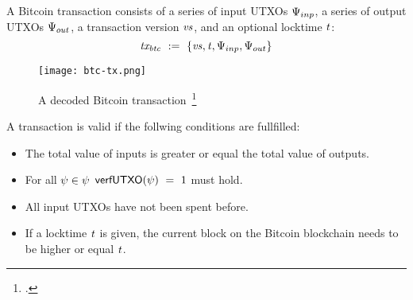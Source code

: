 \begin{definition}
    A Bitcoin transaction consists of a series of input UTXOs $\Psi_{inp}$, a series of output UTXOs $\Psi_{out}$, a
    transaction version $\mathit{vs}$, and an optional locktime $\mathit{t}$:
    \[ \mathit{tx_{btc}} ~:=~ \{ \mathit{vs}, \mathit{t}, \Psi_{inp}, \Psi_{out} \} \]
\end{definition}

\begin{figure}
    \begin{center}
        \texttt{[image: btc-tx.png]}
    \end{center}
    \caption{A decoded Bitcoin transaction~\footcite{https://github.com/bitcoinbook/bitcoinbook/blob/develop/ch06.asciidoc} \label{fig:btc-tx}}
\end{figure}

A transaction is valid if the follwing conditions are fullfilled:

\begin{itemize}
    \item The total value of inputs is greater or equal the total value of outputs.
    \item For all $\psi \in \psi$ $\mathsf{verfUTXO}(\psi) ~=~ 1$ must hold.
    \item All input UTXOs have not been spent before.
    \item If a locktime $\mathit{t}$ is given, the current block on the Bitcoin blockchain needs to be higher or equal $\mathit{t}$.
\end{itemize}

